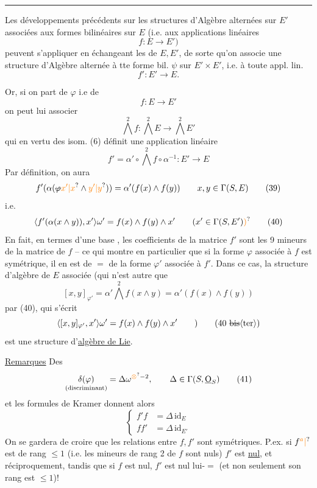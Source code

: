 \begin{center}\rule{1.3cm}{0.4pt}\end{center}

Les développements précédents sur les structures d'Algèbre alternées sur $E'$ associées aux formes bilinéaires sur $E$ (i.e. aux applications linéaires
\[
 f:E\longrightarrow E')
\]
peuvent s'appliquer en échangeant les  de $E,E'$, de sorte qu'on associe une structure d'Algèbre alternée  à tte forme bil. $\psi$ sur $E'\times E'$, i.e. à toute appl. lin.
\[
 f':E'\longrightarrow E .
\]

Or, si on part de $\varphi$ i.e de
\[
 f:E\longrightarrow E' \tag*{(36)}
\]
on peut lui associer
\[
 \bigwedge^2 f:\bigwedge^2 E\longrightarrow\bigwedge^2 E' \tag*{(37)}
\]
qui en vertu des isom. (6) définit une application linéaire
\[
 f'=\alpha'\circ\bigwedge^2 f\circ\alpha^{-1}:E'\longrightarrow E \tag*{(38)}
\]
 Par définition, on aura
\[
 f'(\alpha(\deleted{\varphi}\unsure{x'|x}\wedge\unsure{y'|y}))=\alpha'(f(x)\wedge f(y))\qquad x,y\in\Gamma(S,E) \tag*{(39)}
\]
i.e.
\[
 \langle f'(\alpha(x\wedge y)),x'\rangle\omega'=f(x)\wedge f(y)\wedge x'\qquad(x'\in\Gamma(S,E')\unsure{)} \tag*{(40)}
\]
En fait, en termes d'une base , les coefficients de la matrice  $f'$ sont les 9 mineurs de la matrice de $f$ -- ce qui montre en particulier que si la forme  $\varphi$ associée à $f$ est symétrique, il en est de $=$ de la forme $\varphi'$ associée à $f'$. Dans ce cas, la structure d'algèbre de $E$ associée  (qui n'est autre que
\[
 [x,y]_{\varphi'}=\alpha'\bigwedge^2 f(x\wedge y)=\alpha'(f(x)\wedge f(y)) \tag*{(40 bis)}
\]
 par (40), qui s'écrit
\[
 \langle[x,y]_{\varphi'},x'\rangle\omega'=f(x)\wedge f(y)\wedge x'\qquad ) \tag*{(40 \deleted{bis}\inserted{ter})}
\]
est  une structure d'\uline{algèbre de Lie}.

\uline{Remarques} Des 
\[
 \underset{\text{(discriminant)}}{\delta(\varphi)}=\Delta\omega^{\unsure{\otimes}{-2}},\qquad\Delta\in\Gamma(S,\underline{\mathrm O}_S) \tag*{(41)}
\]
et les formules de Kramer donnent alors
\[
 \left\{\begin{aligned}
 f'f&=\Delta\,\mathrm{id}_E\\
 ff'&=\Delta\,\mathrm{id}_{E'}
 \end{aligned}\right. \tag*{(42)}
\]
On se gardera de croire que les relations entre $f,f'$ sont symétriques. P.ex. si $f\unsure{^{a}|}$ est de rang $\leq1$ (i.e. les mineurs de rang 2 de $f$ sont nuls) $f'$ est \uline{nul}, et réciproquement, tandis que si $f$ est nul, $f'$ est nul lui-$=$ (et non seulement son rang est $\leq1$)!

